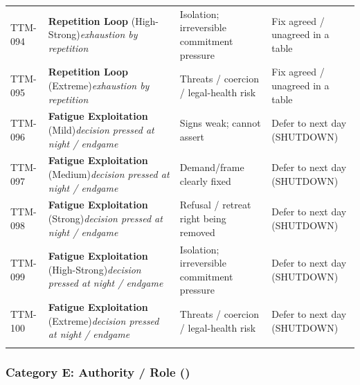 \begin{small}
\begin{longtable}{@{}p{1.4cm}p{3.6cm}p{3.6cm}p{4.0cm}@{}}
\addlinespace[0.2em]
TTM-094 & \textbf{Repetition Loop} (High-Strong)\newline\textit{\footnotesize exhaustion by repetition} & Isolation; irreversible commitment pressure & Fix agreed / unagreed in a table \\
\addlinespace[0.2em]
TTM-095 & \textbf{Repetition Loop} (Extreme)\newline\textit{\footnotesize exhaustion by repetition} & Threats / coercion / legal-health risk & Fix agreed / unagreed in a table \\
\addlinespace[0.2em]
TTM-096 & \textbf{Fatigue Exploitation} (Mild)\newline\textit{\footnotesize decision pressed at night / endgame} & Signs weak; cannot assert & Defer to next day (SHUTDOWN) \\
\addlinespace[0.2em]
TTM-097 & \textbf{Fatigue Exploitation} (Medium)\newline\textit{\footnotesize decision pressed at night / endgame} & Demand/frame clearly fixed & Defer to next day (SHUTDOWN) \\
\addlinespace[0.2em]
TTM-098 & \textbf{Fatigue Exploitation} (Strong)\newline\textit{\footnotesize decision pressed at night / endgame} & Refusal / retreat right being removed & Defer to next day (SHUTDOWN) \\
\addlinespace[0.2em]
TTM-099 & \textbf{Fatigue Exploitation} (High-Strong)\newline\textit{\footnotesize decision pressed at night / endgame} & Isolation; irreversible commitment pressure & Defer to next day (SHUTDOWN) \\
\addlinespace[0.2em]
TTM-100 & \textbf{Fatigue Exploitation} (Extreme)\newline\textit{\footnotesize decision pressed at night / endgame} & Threats / coercion / legal-health risk & Defer to next day (SHUTDOWN) \\
\addlinespace[0.2em]
\end{longtable}
\end{small}

\subsubsection*{Category E: Authority / Role ()}

